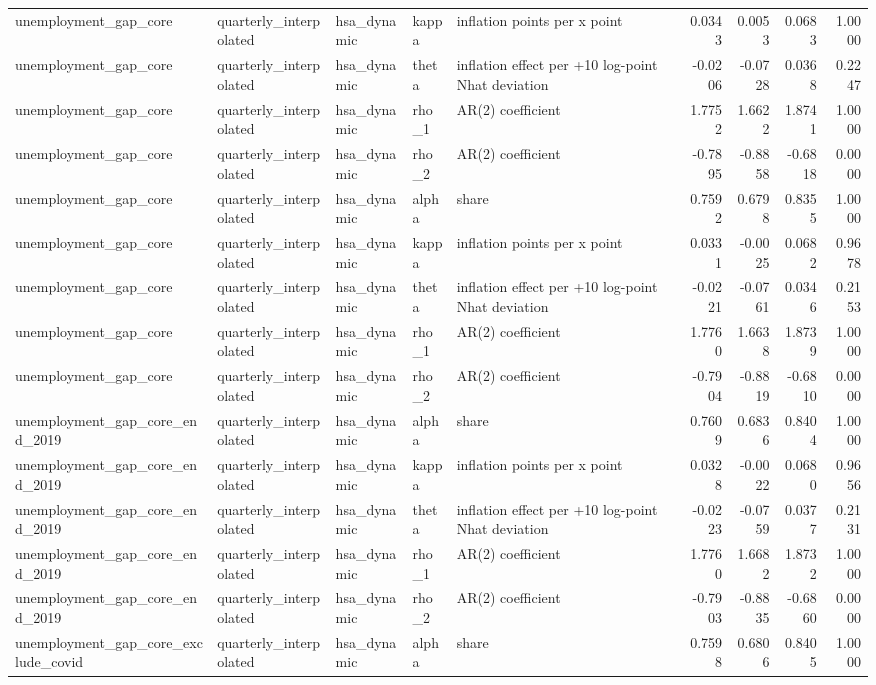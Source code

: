 \begin{tabular}{lllllrrrr}
unemployment\_gap\_core & quarterly\_interpolated & hsa\_dynamic & kappa & inflation points per x point & 0.0343 & 0.0053 & 0.0683 & 1.0000 \\
unemployment\_gap\_core & quarterly\_interpolated & hsa\_dynamic & theta & inflation effect per +10 log-point Nhat deviation & -0.0206 & -0.0728 & 0.0368 & 0.2247 \\
unemployment\_gap\_core & quarterly\_interpolated & hsa\_dynamic & rho\_1 & AR(2) coefficient & 1.7752 & 1.6622 & 1.8741 & 1.0000 \\
unemployment\_gap\_core & quarterly\_interpolated & hsa\_dynamic & rho\_2 & AR(2) coefficient & -0.7895 & -0.8858 & -0.6818 & 0.0000 \\
unemployment\_gap\_core & quarterly\_interpolated & hsa\_dynamic & alpha & share & 0.7592 & 0.6798 & 0.8355 & 1.0000 \\
unemployment\_gap\_core & quarterly\_interpolated & hsa\_dynamic & kappa & inflation points per x point & 0.0331 & -0.0025 & 0.0682 & 0.9678 \\
unemployment\_gap\_core & quarterly\_interpolated & hsa\_dynamic & theta & inflation effect per +10 log-point Nhat deviation & -0.0221 & -0.0761 & 0.0346 & 0.2153 \\
unemployment\_gap\_core & quarterly\_interpolated & hsa\_dynamic & rho\_1 & AR(2) coefficient & 1.7760 & 1.6638 & 1.8739 & 1.0000 \\
unemployment\_gap\_core & quarterly\_interpolated & hsa\_dynamic & rho\_2 & AR(2) coefficient & -0.7904 & -0.8819 & -0.6810 & 0.0000 \\
unemployment\_gap\_core\_end\_2019 & quarterly\_interpolated & hsa\_dynamic & alpha & share & 0.7609 & 0.6836 & 0.8404 & 1.0000 \\
unemployment\_gap\_core\_end\_2019 & quarterly\_interpolated & hsa\_dynamic & kappa & inflation points per x point & 0.0328 & -0.0022 & 0.0680 & 0.9656 \\
unemployment\_gap\_core\_end\_2019 & quarterly\_interpolated & hsa\_dynamic & theta & inflation effect per +10 log-point Nhat deviation & -0.0223 & -0.0759 & 0.0377 & 0.2131 \\
unemployment\_gap\_core\_end\_2019 & quarterly\_interpolated & hsa\_dynamic & rho\_1 & AR(2) coefficient & 1.7760 & 1.6682 & 1.8732 & 1.0000 \\
unemployment\_gap\_core\_end\_2019 & quarterly\_interpolated & hsa\_dynamic & rho\_2 & AR(2) coefficient & -0.7903 & -0.8835 & -0.6860 & 0.0000 \\
unemployment\_gap\_core\_exclude\_covid & quarterly\_interpolated & hsa\_dynamic & alpha & share & 0.7598 & 0.6806 & 0.8405 & 1.0000 \\

\end{tabular}
